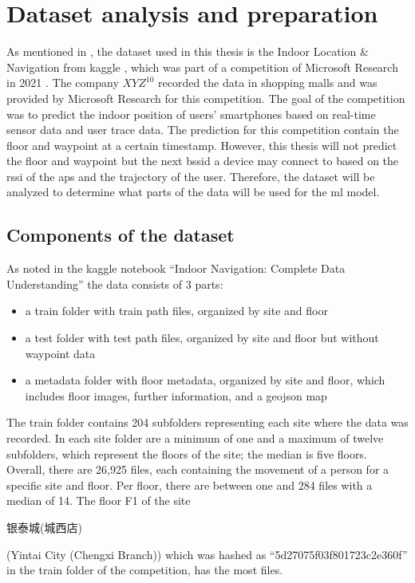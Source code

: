 \chapter{Dataset analysis and preparation}\label{ch:data-ana}

As mentioned in , the dataset used in this thesis is the Indoor Location \& Navigation from kaggle \cite{kaggle}, which was part of a competition of Microsoft Research in 2021 \cite{IndoorLocationNavigation}.
The company \(XYZ^{10}\) recorded the data in shopping malls and was provided by Microsoft Research for this competition.
The goal of the competition was to predict the indoor position of users' smartphones based on real-time sensor data and user trace data.
The prediction for this competition contain the floor and waypoint at a certain timestamp.
However, this thesis will not predict the floor and waypoint but the next \ac{bssid} a device may connect to based on the \ac{rssi} of the \acp{ap} and the trajectory of the user.
Therefore, the dataset will be analyzed to determine what parts of the data will be used for the \ac{ml} model.

\section{Components of the dataset}\label{sec:data}
As noted in the kaggle notebook ``Indoor Navigation: Complete Data Understanding'' \cite{IndoorNavigationUnderstanding} the data consists of 3 parts:

\begin{itemize}
    \item a train folder with train path files, organized by site and floor
    \item a test folder with test path files, organized by site and floor but without waypoint data
    \item a metadata folder with floor metadata, organized by site and floor, which includes floor images, further information, and a geojson map
\end{itemize}

The train folder contains 204 subfolders representing each site where the data was recorded.
In each site folder are a minimum of one and a maximum of twelve subfolders, which represent the floors of the site; the median is five floors.
Overall, there are 26,925 files, each containing the movement of a person for a specific site and floor.
Per floor, there are between one and 284 files with a median of 14.
The floor F1 of the site \begin{CJK*}{UTF8}{gbsn}银泰城(城西店)\end{CJK*} (Yintai City (Chengxi Branch)) which was hashed as ``5d27075f03f801723c2e360f'' in the train folder of the competition, has the most files.


